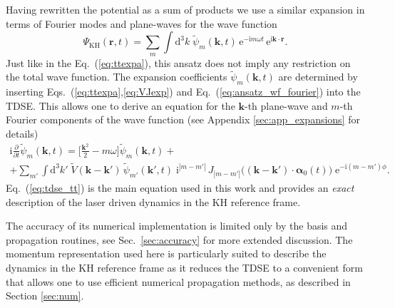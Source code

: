 \documentclass[
pra%
,preprint%
,amssymb, nobibnotes, aps, superscriptaddress, floatfix]{revtex4}
\renewcommand{\imath}{\mathrm{i}}
\newcommand{\dd}{\mathrm{d}}
\newcommand{\rv}{\mathbf{r}}
\newcommand{\av}{\boldsymbol{\alpha}}
\newcommand{\kv}{\mathbf{k}}
\newcommand{\khsub}{\mathrm{KH}}
\newcommand{\phase}{\phi}
\newcommand{\psit}{\widetilde{\psi}}
\newcommand{\Vt}{\widetilde{V}}
\newcommand{\intK}{\int \dd^3 k}
\newcommand{\Vidx}[1]{\Vt_{#1}}
\newcommand{\Vkp}{\Vt(\kv-\kv')} %
\newcommand{\Pidx}[1]{\psit_{#1}}
\newcommand{\Pmk}{\Pidx{m}(\kv, t)} %
\newcommand{\Pmkp}{\Pidx{m}(\kv', t)}
\newcommand{\Pmpkp}{\Pidx{m'}(\kv', t)} %
\begin{document}
Having rewritten the potential as a sum of products we use a similar expansion in terms of Fourier modes and plane-waves for the wave function
\begin{equation}
\Psi_{\khsub}(\rv, t) = \sum_{m} \intK \; \Pmk \, \mathrm{e}^{-\imath m \omega t} \, \mathrm{e}^{\imath \kv \cdot \rv}. \label{eq:ansatz_wf_fourier}
\end{equation}
Just like in the Eq.~(\ref{eq:ttexpa}), this ansatz does not imply any restriction on the total wave function. The expansion coefficients $\Pmk$ are determined by inserting Eqs.~(\ref{eq:ttexpa},\ref{eq:VJexp}) and Eq.~(\ref{eq:ansatz_wf_fourier}) into the TDSE. This allows one to derive an equation for the $\kv$-th plane-wave and $m$-th Fourier components of the wave function (see Appendix \ref{sec:app_expansions} for details)
\begin{multline}
\imath \frac{\partial}{\partial t}\Pmk = \Big[ \frac{\kv^2}{2} - m \omega \Big] \Pmk +\\
+ \sum_{m'} \intK' \; \Vkp \, \Pmpkp \;  
\imath^{|m-m'|} \, J_{|m-m'|}\big( (\kv-\kv') \cdot \av_0(t) \big) \; \mathrm{e}^{-\imath (m-m')\phase}.\label{eq:tdse_tt}
\end{multline}
Eq.~(\ref{eq:tdse_tt}) is the main equation used in this work and provides an \emph{exact} description of the laser driven dynamics in the KH reference frame. 

The accuracy of its numerical implementation is limited only by the basis and propagation routines, see Sec.~\ref{sec:accuracy} for more extended discussion.
The momentum representation used here is particularly suited to describe the dynamics in the KH reference frame as it reduces the TDSE to a convenient form that allows one to use efficient numerical propagation methods, as described in Section \ref{sec:num}.
\end{document}
